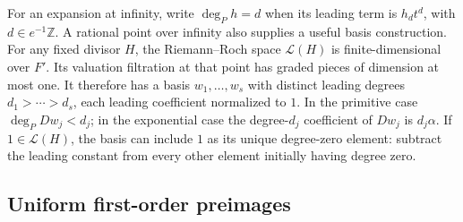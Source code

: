 \documentclass[11pt,a4paper]{article}
\theoremstyle{definition}
\theoremstyle{remark}
\numberwithin{equation}{section}
\begin{document}
For an expansion at infinity, write $\deg_P h=d$ when its leading
term is $h_dt^d$, with $d\in e^{-1}\mathbb Z$.  A rational point over
infinity also supplies a useful basis construction.  For any fixed
divisor $H$, the Riemann--Roch space $\mathcal L(H)$ is finite-dimensional
over $F'$.  Its valuation filtration at that point has graded pieces
of dimension at most one.  It therefore has a basis $w_1,\ldots,w_s$
with distinct leading degrees $d_1>\cdots>d_s$, each leading
coefficient normalized to $1$.  In the primitive case
$\deg_P Dw_j<d_j$; in the exponential case the degree-$d_j$ coefficient
of $Dw_j$ is $d_j\alpha$.  If $1\in\mathcal L(H)$, the basis can
include $1$ as its unique degree-zero element: subtract the leading
constant from every other element initially having degree zero.

\subsection{Uniform first-order preimages}
\end{document}
